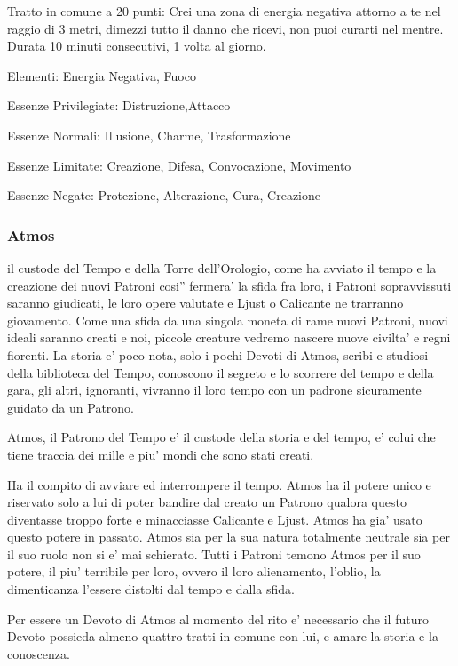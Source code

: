 \documentclass[a4paper,11pt,twoside,openany]{dndbook}
\begin{document}
{Tratto in comune a 20 punti: Crei una zona di energia negativa attorno a te nel raggio di 3 metri, dimezzi tutto il danno che ricevi, non puoi curarti nel mentre. Durata 10 minuti consecutivi, 1 volta al giorno.

\bigskip

Elementi: Energia Negativa, Fuoco

\bigskip

Essenze Privilegiate: Distruzione,Attacco

Essenze Normali: Illusione, Charme, Trasformazione

Essenze Limitate: Creazione, Difesa, Convocazione, Movimento

Essenze Negate: Protezione, Alterazione, Cura, Creazione

\subsubsection{Atmos}

\label{atmos}

il custode del Tempo e della Torre dell'Orologio, come ha avviato il tempo e la creazione dei nuovi Patroni cosi'' fermera' la sfida fra loro, i Patroni sopravvissuti saranno giudicati, le loro opere valutate e Ljust o Calicante ne trarranno giovamento. Come una sfida da una singola moneta di rame nuovi Patroni, nuovi ideali saranno creati e noi, piccole creature vedremo nascere nuove civilta' e regni fiorenti. La storia e' poco nota, solo i pochi Devoti di Atmos, scribi e studiosi della biblioteca del Tempo, conoscono il segreto e lo scorrere del tempo e della gara, gli altri, ignoranti, vivranno il loro tempo con un padrone sicuramente guidato da un Patrono.

Atmos, il Patrono del Tempo e' il custode della storia e del tempo, e' colui che tiene traccia dei mille e piu' mondi che sono stati creati.

Ha il compito di avviare ed interrompere il tempo. Atmos ha il potere unico e riservato solo a lui di poter bandire dal creato un Patrono qualora questo diventasse troppo forte e minacciasse Calicante e Ljust. Atmos ha gia' usato questo potere in passato. Atmos sia per la sua natura totalmente neutrale sia per il suo ruolo non si e' mai schierato. Tutti i Patroni temono Atmos per il suo potere, il piu' terribile per loro, ovvero il loro alienamento, l'oblio, la dimenticanza l'essere distolti dal tempo e dalla sfida.

Per essere un Devoto di Atmos al momento del rito e' necessario che il futuro Devoto possieda almeno quattro tratti in comune con lui, e amare la storia e la conoscenza.

}
\end{document}
